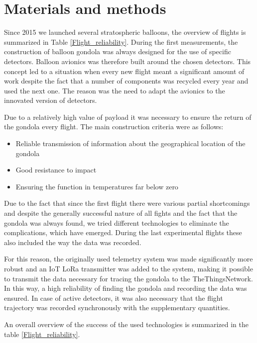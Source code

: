 \documentclass{Rpd}
\begin{document}
\section{Materials and methods}

Since 2015 we launched several stratospheric balloons, the overview of flights is summarized in Table \ref{Flight_reliability}.
During the first measurements, the construction of balloon gondola was always designed for the use of specific detectors. Balloon avionics was therefore built around the chosen detectors.
This concept led to a situation when every new flight meant a significant amount of work despite the fact that a number of components was recycled every year and used the next one. The reason was the need to adapt the avionics to the innovated version of detectors.

Due to a relatively high value of payload it was necessary to ensure the return of the gondola every flight. The main construction criteria were as follows:


\begin{itemize}
\item Reliable transmission of information about the geographical location of the gondola
\item Good resistance to impact
\item Ensuring the function in temperatures far below zero
\end{itemize}


Due to the fact that since the first flight there were various partial shortcomings and despite the generally successful nature of all fights and the fact that the gondola was always found, we tried different technologies to eliminate the complications, which have emerged. During the last experimental flights these also included the way the data was recorded.

For this reason, the originally used telemetry system was made significantly more robust and an IoT LoRa transmitter was added to the system, making it possible to transmit the data necessary for tracing the gondola to the TheThingsNetwork. In this way, a high reliability of finding the gondola and recording the data was ensured. In case of active detectors, it was also necessary that the flight trajectory was recorded synchronously with the supplementary quantities.


An overall overview of the success of the used technologies is summarized in the table \ref{Flight_reliability}.
\end{document}
